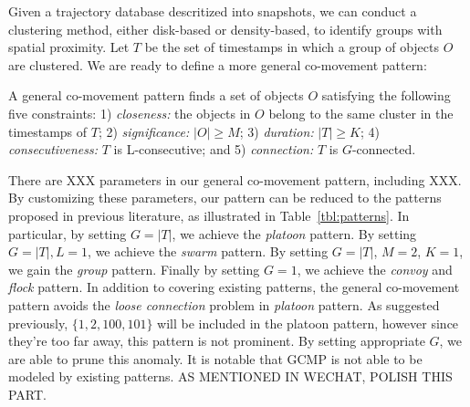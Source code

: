 Given a trajectory database descritized into snapshots, we can conduct a clustering method, either disk-based or density-based, to identify groups with spatial proximity. Let $T$ be the set of timestamps in which a group of objects $O$ are clustered. We are ready to define a more general co-movement pattern:
\begin{definition}
A general co-movement pattern finds a set of objects $O$ satisfying the following five constraints: 1) \textit{closeness:} the objects in $O$ belong to the same cluster in the timestamps of $T$; 2) \textit{significance:} $|O| \geq M$; 3) \textit{duration:} $|T| \geq K$; 4) \textit{consecutiveness:} $T$ is L-consecutive; and 5) \textit{connection:} $T$ is $G$-connected.

\end{definition}
There are XXX parameters in our general co-movement pattern, including XXX. By customizing these parameters, our pattern can be reduced to the patterns proposed in previous literature, as illustrated in Table~\ref{tbl:patterns}. In particular, by setting $G=|T|$, we achieve the \emph{platoon} pattern. By setting $G=|T|,L=1$, we achieve the \emph{swarm} pattern. By setting $G=|T|$, $M=2$, $K=1$, we gain the \emph{group} pattern. Finally by setting $G=1$, we achieve the \emph{convoy} and \emph{flock} pattern. 
In addition to covering existing patterns, the general co-movement pattern avoids the \emph{loose connection} problem in \emph{platoon} pattern. As suggested previously, $\{1,2, 100,101\}$ will be included in the platoon pattern, however since they're too far away, this pattern is not prominent. By setting appropriate $G$, we are able to prune this anomaly. It is notable that GCMP is not able to be modeled by existing patterns. AS MENTIONED IN WECHAT, POLISH THIS PART.

